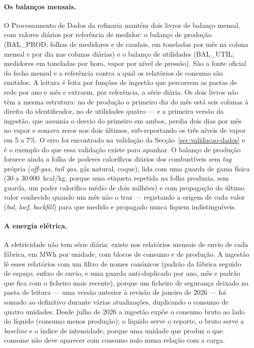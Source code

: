 \paragraph{Os balanços mensais.} O Processamento de Dados da refinaria
mantém dois livros de balanço mensal, com valores diários por referência
de medidor: o balanço de produção (BAL\_PROD; folhas de medidores e de
caudais, em toneladas por mês na coluna mensal e por dia nas colunas
diárias) e o balanço de utilidades (BAL\_UTIL; medidores em toneladas por
hora, vapor por nível de pressão). São a fonte oficial do fecho mensal e a
referência contra a qual os relatórios de consumo são emitidos. A leitura
é feita por funções de ingestão que percorrem as pastas de rede por ano e
mês e extraem, por referência, a série diária. Os dois livros não têm a
mesma estrutura: no de produção o primeiro dia do mês está seis colunas à
direita do identificador, no de utilidades quatro --- e a primeira versão
da ingestão, que assumia o desvio do primeiro em ambos, perdia dois dias
por mês no vapor e somava zeros nos dois últimos, sub-reportando os três
níveis de vapor em 5 a 7\%. O erro foi encontrado na validação da
Secção~\ref{sec:validacao-dados} e é o exemplo do que essa validação existe
para apanhar. O balanço de produção fornece ainda a folha de poderes
caloríficos diários dos combustíveis sem \emph{tag} própria (\emph{off-gas},
\emph{tail gas}, gás natural, coque), lida com uma guarda de gama física
(30 a 30\,000~kcal/kg, porque uma etiqueta repetida na folha produzia, sem
guarda, um poder calorífico médio de dois milhões) e com propagação do
último valor conhecido quando um mês não o traz --- registando a origem de
cada valor (\emph{bal}, \emph{locf}, \emph{backfill}) para que medido e
propagado nunca fiquem indistinguíveis.

\paragraph{A energia elétrica.} A eletricidade não tem série diária: existe
nos relatórios mensais de envio de cada fábrica, em MWh por unidade, com
blocos de consumo e de produção. A ingestão lê esses relatórios com um
filtro de nomes canónicos (padrão da fábrica seguido de espaço, sufixo de
envio, e uma guarda anti-duplicado por ano, mês e padrão que fica com o
ficheiro mais recente), porque um ficheiro de segurança deixado na pasta
de leitura --- uma versão anterior à revisão de janeiro de 2026 --- foi
somado ao definitivo durante várias atualizações, duplicando o consumo de
quatro unidades. Desde julho de 2026 a ingestão expõe o consumo bruto ao
lado do líquido (consumo menos produção): o líquido serve o reporte, o
bruto serve a \emph{baseline} e o índice de intensidade, porque uma unidade
que produz o que consome não deve aparecer com consumo nulo numa relação
com a carga.

